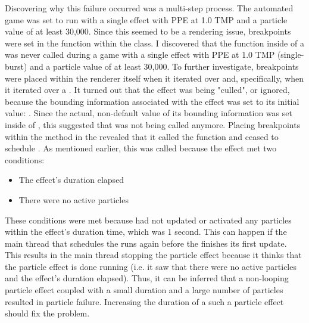 Discovering why this failure occurred was a multi-step process. The automated game was set to run with a single effect with PPE at 1.0 TMP and a particle value of at least 30,000. Since this seemed to be a rendering issue, breakpoints were set in the  function within the  class. I discovered that the  function inside of a  was never called during a game with a single effect with PPE at 1.0 TMP (single-burst) and a particle value of at least 30,000. To further investigate, breakpoints were placed within the renderer itself when it iterated over  and, specifically, when it iterated over a . It turned out that the effect was being "culled", or ignored, because the bounding information associated with the effect was set to its initial value: . Since the actual, non-default value of its bounding information was set inside of , this suggested that  was not being called anymore. Placing breakpoints within the  method in the  revealed that it called the  function and ceased to schedule . As mentioned earlier, this was called because the effect met two conditions:

\begin{itemize}[nolistsep,topsep=0pt]
	\item The effect's duration elapsed
	\item There were no active particles
\end{itemize}

These conditions were met because  had not updated or activated any particles within the effect's duration time, which was 1 second. This can happen if the main thread that schedules the  runs again before the  finishes its first update. This results in the main thread stopping the particle effect because it thinks that the particle effect is done running (i.e. it saw that there were no active particles and the effect's duration elapsed). Thus, it can be inferred that a non-looping particle effect coupled with a small duration and a large number of particles resulted in particle failure. Increasing the duration of a such a particle effect should fix the problem.

